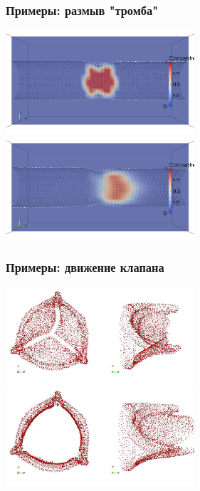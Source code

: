 \documentclass[14pt]{beamer}
\begin{document}
\begin{frame}
\frametitle{Примеры: размыв "тромба"}
    \begin{center}
        \vspace{-1.40mm}
        \includegraphics[width=7cm]{thrombus_in_vessel_1.png}
        \vspace{0.40mm}
        \includegraphics[width=7cm]{thrombus_in_vessel_2.png}
    \end{center}
\end{frame}

\begin{frame}
\frametitle{Примеры: движение клапана}
    \begin{center}
        \vspace{-1.40mm}
        \includegraphics[width=7cm]{real_valve_1.png}
        \vspace{0.40mm}
        \includegraphics[width=7cm]{real_valve_2.png}
    \end{center}
\end{frame}
\end{document}

